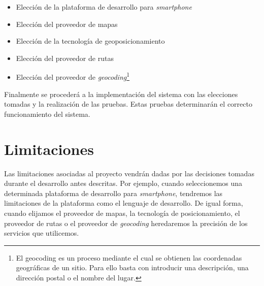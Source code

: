\begin{itemize}
  \item Elección de la plataforma de desarrollo para \emph{smartphone}
  \item Elección del proveedor de mapas
  \item Elección de la tecnología de geoposicionamiento
  \item Elección del proveedor de rutas
  \item Elección del proveedor de \emph{geocoding}\footnote{El geocoding es un proceso mediante el
    cual se obtienen las coordenadas geográficas de un sitio. Para ello basta con introducir una
    descripción, una dirección postal o el nombre del lugar.}
\end{itemize}

Finalmente se procederá a la implementación del sistema con las elecciones tomadas y la
realización de las pruebas. Estas pruebas determinarán el correcto funcionamiento del sistema.

\section{Limitaciones}

Las limitaciones asociadas al proyecto vendrán dadas por las decisiones tomadas durante el
desarrollo antes descritas. Por ejemplo, cuando seleccionemos una determinada plataforma de
desarrollo para \emph{smartphone}, tendremos las limitaciones de la plataforma como el lenguaje de
desarrollo. De igual forma, cuando elijamos el proveedor de mapas, la tecnología de posicionamiento,
el proveedor de rutas o el proveedor de \emph{geocoding} heredaremos la precisión de los servicios
que utilicemos.

